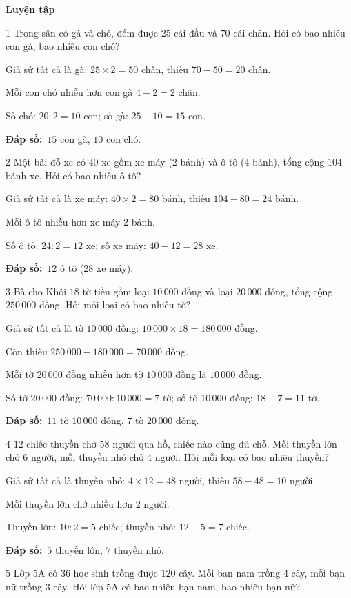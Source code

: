 \documentclass[11pt]{article}
\newif\ifsol \solfalse
\providecommand{\AnsWord}{Đáp số}
\newcommand{\dapso}[1]{\par\textbf{\AnsWord:}\ #1}
\newcommand{\probsol}[1]{%
  \begin{lrbox}{\solmeasure}\begin{minipage}{\dimexpr\linewidth-24pt\relax}#1\end{minipage}\end{lrbox}%
  \ifsol
    \begin{solbox}#1\end{solbox}%
  \else
    \setlength{\solht}{\dimexpr\ht\solmeasure+\dp\solmeasure+0.85cm\relax}%
    \ifdim\solht<1.35cm\setlength{\solht}{1.35cm}\fi
    \begin{tcolorbox}[colback=white,colframe=Line,boxrule=0.8pt,arc=5pt,
      left=8pt,right=8pt,top=4pt,bottom=4pt,height=\solht]{\footnotesize\color{Slate}\itshape\WorkWord}\end{tcolorbox}%
  \fi}
\newcommand{\dividerbar}[1]{\par\vspace{0.6em}\noindent
  \begin{tcolorbox}[enhanced,frame hidden,interior hidden,borderline west={5pt}{0pt}{ProbBlue},
    colback=white,left=12pt,right=12pt,top=5pt,bottom=5pt,arc=4pt]
  {\large\bfseries\color{ProbBlue} #1}\end{tcolorbox}\vspace{0.4em}}
\newcommand{\gap}{\vspace{0.3cm}}
\def\WorkWord{Bài làm:}
\def\AnsWord{Đáp số}
\begin{document}
\dividerbar{Luyện tập}
\begin{probbox}{1}{\relax}
Trong sân có gà và chó, đếm được $25$ cái đầu và $70$ cái chân. Hỏi có bao nhiêu con gà, bao nhiêu con chó?
\end{probbox}
\probsol{
Giả sử tất cả là gà: $25\times2=50$ chân, thiếu $70-50=20$ chân.\par
Mỗi con chó nhiều hơn con gà $4-2=2$ chân.\par Số chó: $20:2=10$ con; số gà: $25-10=15$ con.
\dapso{$15$ con gà, $10$ con chó.}}
\gap
\begin{probbox}{2}{\relax}
Một bãi đỗ xe có $40$ xe gồm xe máy ($2$ bánh) và ô tô ($4$ bánh), tổng cộng $104$ bánh xe. Hỏi có bao nhiêu ô tô?
\end{probbox}
\probsol{
Giả sử tất cả là xe máy: $40\times2=80$ bánh, thiếu $104-80=24$ bánh.\par
Mỗi ô tô nhiều hơn xe máy $2$ bánh.\par Số ô tô: $24:2=12$ xe; số xe máy: $40-12=28$ xe.
\dapso{$12$ ô tô ($28$ xe máy).}}
\gap
\begin{probbox}{3}{\relax}
Bà cho Khôi $18$ tờ tiền gồm loại $10\,000$ đồng và loại $20\,000$ đồng, tổng cộng $250\,000$ đồng. Hỏi mỗi loại có bao nhiêu tờ?
\end{probbox}
\probsol{
Giả sử tất cả là tờ $10\,000$ đồng: $10\,000\times18=180\,000$ đồng.\par
Còn thiếu $250\,000-180\,000=70\,000$ đồng.\par
Mỗi tờ $20\,000$ đồng nhiều hơn tờ $10\,000$ đồng là $10\,000$ đồng.\par
Số tờ $20\,000$ đồng: $70\,000:10\,000=7$ tờ; số tờ $10\,000$ đồng: $18-7=11$ tờ.
\dapso{$11$ tờ $10\,000$ đồng, $7$ tờ $20\,000$ đồng.}}
\gap
\begin{probbox}{4}{\relax}
$12$ chiếc thuyền chở $58$ người qua hồ, chiếc nào cũng đủ chỗ. Mỗi thuyền lớn chở $6$ người, mỗi thuyền nhỏ chở $4$ người. Hỏi mỗi loại có bao nhiêu thuyền?
\end{probbox}
\probsol{
Giả sử tất cả là thuyền nhỏ: $4\times12=48$ người, thiếu $58-48=10$ người.\par
Mỗi thuyền lớn chở nhiều hơn $2$ người.\par Thuyền lớn: $10:2=5$ chiếc; thuyền nhỏ: $12-5=7$ chiếc.
\dapso{$5$ thuyền lớn, $7$ thuyền nhỏ.}}
\gap
\begin{probbox}{5}{\relax}
Lớp 5A có $36$ học sinh trồng được $120$ cây. Mỗi bạn nam trồng $4$ cây, mỗi bạn nữ trồng $3$ cây. Hỏi lớp 5A có bao nhiêu bạn nam, bao nhiêu bạn nữ?
\end{probbox}
\end{document}

